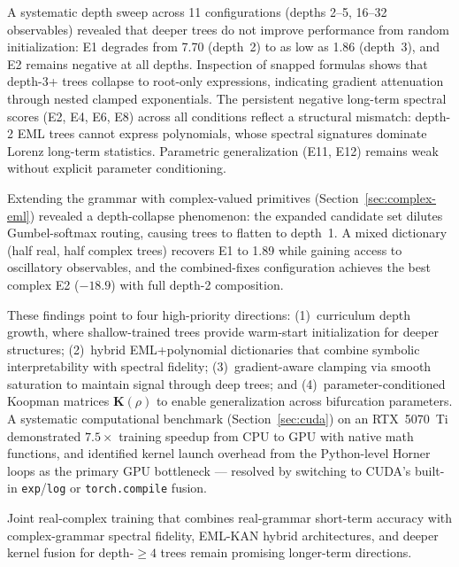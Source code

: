 \documentclass[11pt]{article}
\newcommand{\bK}{\mathbf{K}}
\begin{document}
A systematic depth sweep across 11 configurations (depths 2--5, 16--32
observables) revealed that deeper trees do not improve performance from random
initialization: E1 degrades from 7.70 (depth~2) to as low as 1.86 (depth~3),
and E2 remains negative at all depths.  Inspection of snapped formulas shows
that depth-3+ trees collapse to root-only expressions, indicating gradient
attenuation through nested clamped exponentials.  The persistent negative
long-term spectral scores (E2, E4, E6, E8) across all conditions reflect a
structural mismatch: depth-2 EML trees cannot express polynomials, whose spectral
signatures dominate Lorenz long-term statistics.  Parametric generalization
(E11, E12) remains weak without explicit parameter conditioning.

Extending the grammar with complex-valued primitives (Section~\ref{sec:complex-eml})
revealed a depth-collapse phenomenon: the expanded candidate set dilutes
Gumbel-softmax routing, causing trees to flatten to depth~1.  A mixed
dictionary (half real, half complex trees) recovers E1 to 1.89 while
gaining access to oscillatory observables, and the combined-fixes
configuration achieves the best complex E2 ($-18.9$) with full depth-2
composition.

These findings point to four high-priority directions: (1)~curriculum depth
growth, where shallow-trained trees provide warm-start initialization for
deeper structures; (2)~hybrid EML+polynomial dictionaries that combine
symbolic interpretability with spectral fidelity; (3)~gradient-aware
clamping via smooth saturation to maintain signal through deep trees;
and (4)~parameter-conditioned Koopman matrices $\bK(\rho)$ to enable
generalization across bifurcation parameters.
A systematic computational benchmark (Section~\ref{sec:cuda}) on an RTX~5070~Ti
demonstrated $7.5\times$ training speedup from CPU to GPU with native math
functions, and identified kernel launch overhead from the Python-level Horner
loops as the primary GPU bottleneck --- resolved by switching to CUDA's built-in
\texttt{exp}/\texttt{log} or \texttt{torch.compile} fusion.

Joint real-complex training that combines real-grammar short-term accuracy with
complex-grammar spectral fidelity, EML-KAN hybrid architectures, and deeper
kernel fusion for depth-$\ge 4$ trees remain promising longer-term directions.




\end{document}
